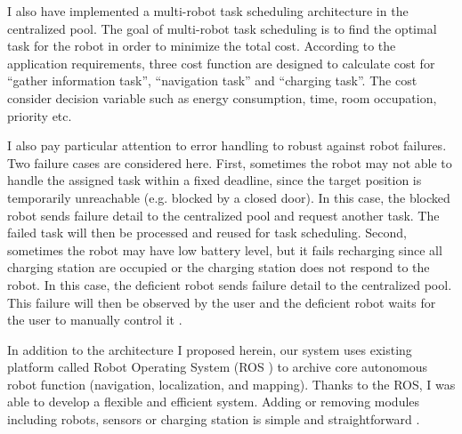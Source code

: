 I also have implemented a multi-robot task scheduling architecture in the centralized pool. The goal of multi-robot task scheduling is to find the optimal task for the robot in order to minimize the total cost. According to the application requirements, three cost function are designed to calculate cost for ``gather information task'', ``navigation task'' and ``charging task''. The cost consider decision variable such as energy consumption, time, room occupation, priority etc. 


I also pay particular attention to error handling to robust against robot failures. 
Two failure cases are considered here. First, sometimes the robot may not able to handle the assigned task within a fixed deadline, since the target position is temporarily unreachable (e.g. blocked by a closed door). In this case, the blocked robot sends failure detail to the centralized pool and request another task. The failed task will then be processed and reused for task scheduling. Second, sometimes the robot may have low battery level, but it fails recharging since all charging station are occupied or the charging station does not respond to the robot. In this case, the deficient robot sends failure detail to the centralized pool. This failure will then be observed by the user and the deficient robot waits for the user to manually control it \cite{Shah7}.

In addition to the architecture I proposed herein, our system uses existing platform called Robot Operating System (ROS \cite{ROSWEB}) to archive core autonomous robot function (navigation, localization, and mapping). Thanks to the ROS, I was able to develop a flexible and efficient system. Adding or removing modules including robots, sensors or charging station is simple and straightforward \cite{Shah7}.




